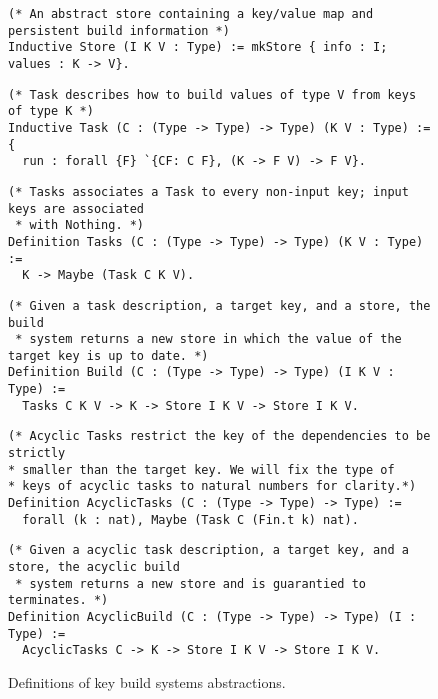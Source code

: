 \documentclass[sigplan,review]{acmart}\settopmatter{printfolios=true,printccs=false,printacmref=false}
\begin{document}
\begin{figure*}[t]
\begin{verbatim}
(* An abstract store containing a key/value map and persistent build information *)
Inductive Store (I K V : Type) := mkStore { info : I; values : K -> V}.
\end{verbatim}
\vspace{-1mm}
\begin{verbatim}
(* Task describes how to build values of type V from keys of type K *)
Inductive Task (C : (Type -> Type) -> Type) (K V : Type) := {
  run : forall {F} `{CF: C F}, (K -> F V) -> F V}.
\end{verbatim}
\vspace{-1mm}
\begin{verbatim}
(* Tasks associates a Task to every non-input key; input keys are associated
 * with Nothing. *)
Definition Tasks (C : (Type -> Type) -> Type) (K V : Type) :=
  K -> Maybe (Task C K V).
\end{verbatim}
\vspace{-1mm}
\begin{verbatim}
(* Given a task description, a target key, and a store, the build
 * system returns a new store in which the value of the target key is up to date. *)
Definition Build (C : (Type -> Type) -> Type) (I K V : Type) :=
  Tasks C K V -> K -> Store I K V -> Store I K V.
\end{verbatim}
\vspace{-1mm}
\begin{verbatim}
(* Acyclic Tasks restrict the key of the dependencies to be strictly
* smaller than the target key. We will fix the type of
* keys of acyclic tasks to natural numbers for clarity.*)
Definition AcyclicTasks (C : (Type -> Type) -> Type) :=
  forall (k : nat), Maybe (Task C (Fin.t k) nat).
\end{verbatim}
\vspace{-1mm}
\begin{verbatim}
(* Given a acyclic task description, a target key, and a store, the acyclic build
 * system returns a new store and is guarantied to terminates. *)
Definition AcyclicBuild (C : (Type -> Type) -> Type) (I : Type) :=
  AcyclicTasks C -> K -> Store I K V -> Store I K V.
\end{verbatim}
\vspace{-3mm}
\caption{Definitions of key build systems abstractions.}\label{fig-defs}
\vspace{-5mm}
\end{figure*}
\end{document}

